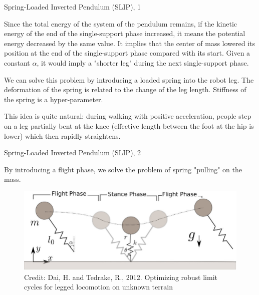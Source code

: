 \documentclass{beamer}
\begin{document}
\begin{frame}{Spring-Loaded Inverted Pendulum (SLIP), 1}
	\begin{flushleft}
		
		Since the total energy of the system of the pendulum remains, if the kinetic energy of the end of the single-support phase increased, it means the potential energy decreased by the same value. It implies that the center of mass lowered its position at the end of the single-support phase compared with its start. Given a constant $\alpha$, it would imply a "shorter leg" during the next single-support phase.
		
		
		\bigskip
		
		We can solve this problem by introducing a loaded spring into the robot leg. The deformation of the spring is related to the change of the leg length. Stiffness of the spring is a hyper-parameter.
		
		\bigskip
		
		 This idea is quite natural: during walking with positive acceleration, people step on a leg partially bent at the knee (effective length between the foot at the hip is lower) which then rapidly straightens.
		
	\end{flushleft}
\end{frame}




\begin{frame}{Spring-Loaded Inverted Pendulum (SLIP), 2}
	\begin{flushleft}
		
		By introducing a flight phase, we solve the problem of spring "pulling" on the mass.
		
		\bigskip
		
		\begin{figure}
			\centering
			\includegraphics[width=0.9\linewidth]{Spring-Loaded-Inverted-Pendulum}
			\caption{Credit: Dai, H. and Tedrake, R., 2012. Optimizing robust limit cycles for legged locomotion on unknown terrain}
			\label{fig:spring-loaded-inverted-pendulum}
		\end{figure}
		
		
		
	\end{flushleft}
\end{frame}
\end{document}
